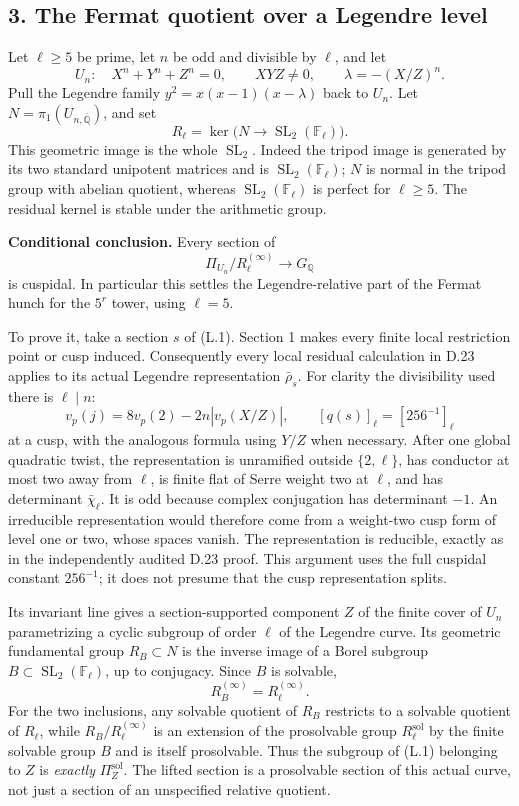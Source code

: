 \subsection*{3. The Fermat quotient over a Legendre level}

Let $\ell\ge5$ be prime, let $n$ be odd and divisible by $\ell$,
and let
\[
 U_n:\quad X^n+Y^n+Z^n=0,\qquad XYZ\ne0,
 \qquad\lambda=-(X/Z)^n.
\]
Pull the Legendre family $y^2=x(x-1)(x-\lambda)$ back to $U_n$.
Let $N=\pi_1(U_{n,\overline{\mathbb Q}})$, and set
\[
 R_\ell=\ker\bigl(N\longrightarrow
                         \operatorname{SL}_2(\mathbb F_\ell)\bigr).
\]
This geometric image is the whole $\operatorname{SL}_2$.
Indeed the tripod image is generated by its two standard
unipotent matrices and is $\operatorname{SL}_2(\mathbb F_\ell)$;
$N$ is normal in the tripod group with abelian quotient, whereas
$\operatorname{SL}_2(\mathbb F_\ell)$ is perfect for $\ell\ge5$.
The residual kernel is stable under the arithmetic group.

\medskip
\noindent\textbf{Conditional conclusion.}
Every section of
\[
 \Pi_{U_n}/R_\ell^{(\infty)}\longrightarrow G_{\mathbb Q}
                                                        \tag{L.1}
\]
is cuspidal.  In particular this settles the Legendre-relative
part of the Fermat hunch for the $5^r$ tower, using $\ell=5$.

To prove it, take a section $s$ of (L.1).  Section 1 makes every
finite local restriction point or cusp induced.  Consequently
every local residual calculation in D.23 applies to its actual
Legendre representation $\bar\rho_s$.  For clarity the divisibility
used there is $\ell\mid n$:
\[
  v_p(j)=8v_p(2)-2n|v_p(X/Z)|,
       \qquad [q(s)]_\ell=[256^{-1}]_\ell
\]
at a cusp, with the analogous formula using $Y/Z$ when necessary.
After one global quadratic twist, the representation is unramified
outside $\{2,\ell\}$, has conductor at most two away from $\ell$,
is finite flat of Serre weight two at $\ell$, and has determinant
$\bar\chi_\ell$.  It is odd because complex conjugation has
determinant $-1$.  An irreducible representation would therefore
come from a weight-two cusp form of level one or two, whose spaces
vanish.  The representation is reducible, exactly as in the
independently audited D.23 proof.  This argument uses the full
cuspidal constant $256^{-1}$; it does not presume that the cusp
representation splits.

Its invariant line gives a section-supported component $Z$ of
the finite cover of $U_n$ parametrizing a cyclic subgroup of order
$\ell$ of the Legendre curve.  Its geometric fundamental group
$R_B\subset N$ is the inverse image of a Borel subgroup
$B\subset\operatorname{SL}_2(\mathbb F_\ell)$, up to conjugacy.
Since $B$ is solvable,
\[
                       R_B^{(\infty)}=R_\ell^{(\infty)}.    \tag{L.2}
\]
For the two inclusions, any solvable quotient of $R_B$ restricts
to a solvable quotient of $R_\ell$, while
$R_B/R_\ell^{(\infty)}$ is an extension of the prosolvable group
$R_\ell^{\mathrm{sol}}$ by the finite solvable group $B$ and is
itself prosolvable.  Thus the subgroup of (L.1) belonging to $Z$
is \emph{exactly} $\Pi_Z^{\mathrm{sol}}$.  The lifted section is
a prosolvable section of this actual curve, not just a section of
an unspecified relative quotient.

